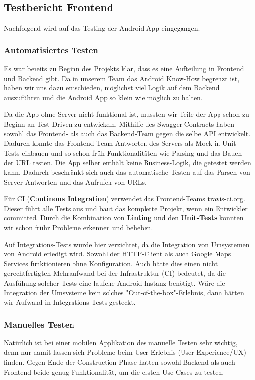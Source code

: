 \subsection{Testbericht Frontend}\label{testbericht_frontend}
Nachfolgend wird auf das Testing der Android App eingegangen.

\subsubsection{Automatisiertes Testen}\label{automatisiertes_test_frontend}
Es war bereits zu Beginn des Projekts klar, dass es eine Aufteilung in Frontend und Backend
gibt. Da in unserem Team das Android Know-How begrenzt ist, haben wir uns dazu entschieden,
möglichst viel Logik auf dem Backend auszuführen und die Android App so klein wie möglich zu halten.

Da die App ohne Server nicht funktional ist, mussten wir Teile der App schon zu Beginn an
Test-Driven zu entwickeln. Mithilfe des Swagger Contracts haben sowohl das Frontend- als auch das
Backend-Team gegen die selbe API entwickelt. Dadurch konnte das Frontend-Team Antworten des Servers
als Mock in Unit-Tests einbauen und so schon früh Funktionalitäten wie Parsing und das Bauen der URL
testen. Die App selber enthält keine Business-Logik, die getestet werden kann. Dadurch beschränkt sich
auch das automatische Testen auf das Parsen von Server-Antworten und das Aufrufen von URLs.

Für CI (\textbf{Continous Integration}) verwendet das Frontend-Teams travis-ci.org. Dieser führt alle Tests
aus und baut das komplette Projekt, wenn ein Entwickler committed. Durch die Kombination von \textbf{Linting}
und den \textbf{Unit-Tests} konnten wir schon frühr Probleme erkennen und beheben.

Auf Integrations-Tests wurde hier verzichtet, da die Integration von Umsystemen von Android erledigt
wird. Sowohl der HTTP-Client als auch Google Maps Services funktionieren ohne Konfiguration. Auch hätte
dies einen nicht gerechtfertigten Mehraufwand bei der Infrastruktur (CI) bedeutet, da die Ausfühung
solcher Tests eine laufene Android-Instanz benötigt. Wäre die Integration der Umsysteme kein solches
"Out-of-the-box"-Erlebnis, dann hätten wir Aufwand in Integrations-Tests gesteckt.

\subsubsection{Manuelles Testen}\label{manuelles_testen_frontend}
Natürlich ist bei einer mobilen Applikation des manuelle Testen sehr wichtig, denn nur damit lassen
sich Probleme beim User-Erlebnis (User Experience/UX) finden. Gegen Ende der Construction Phase
hatten sowohl Backend als auch Frontend beide genug Funktionalität, um die ersten Use Cases zu testen.

